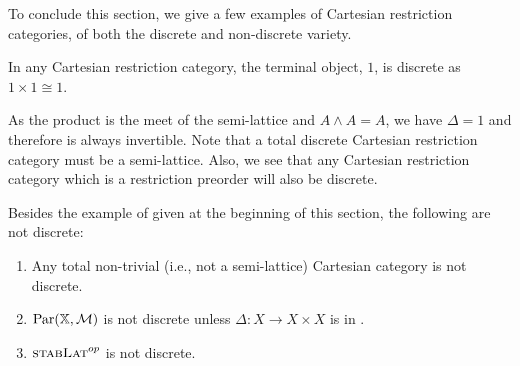 To conclude this section, we give a few examples of Cartesian restriction categories, of both the
discrete and non-discrete variety.

\begin{example}\label{ex:terminal_object_is_discrete}
  In any Cartesian restriction category, the terminal object, $1$, is discrete as $1\times 1 \cong 1$.
\end{example}

\begin{example}\label{ex:semi-lattice_is_discrete}
  As the product is the meet of the semi-lattice and $A\wedge A = A$, we have $\Delta = 1$ and
  therefore is always invertible. Note that a total discrete Cartesian restriction category must be a
  semi-lattice. Also, we see that any Cartesian restriction category which is a restriction preorder
  will also be discrete.
\end{example}

\begin{example}\label{ex:various_not_discrete}
Besides the example of \topcatp given at the beginning of this section, the following are not discrete:
  \begin{enumerate}[{(}i{)}]
  \item Any total non-trivial (i.e., not a semi-lattice) Cartesian category is not discrete.
  \item $\text{Par}(\mathbb{X},\mathcal{M})$ is not discrete unless $\Delta: X\to X\times X$ is in \Mstab.
  \item $\textsc{stabLat}^{op}$ is not discrete.
  \end{enumerate}
\end{example}




